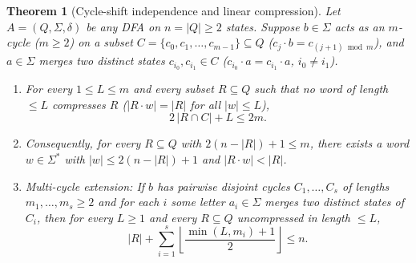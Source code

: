 \documentclass[11pt,a4paper]{article}
\newtheorem{theorem}{Theorem}[section]
\theoremstyle{definition}
\theoremstyle{remark}
\begin{document}
\begin{theorem}[Cycle-shift independence and linear compression]\label{thm:cycle-shift}
Let $A = (Q, \Sigma, \delta)$ be any DFA on $n = |Q| \ge 2$ states. Suppose $b \in \Sigma$ acts as an $m$-cycle ($m \ge 2$) on a subset $C = \{c_0, c_1, \dots, c_{m-1}\} \subseteq Q$ ($c_j \cdot b = c_{(j+1)\bmod m}$), and $a \in \Sigma$ merges two distinct states $c_{i_0}, c_{i_1} \in C$ ($c_{i_0} \cdot a = c_{i_1} \cdot a$, $i_0 \neq i_1$).
\begin{enumerate}[label=\textup{(\arabic*)},leftmargin=*,nosep]
  \item For every $1 \le L \le m$ and every subset $R \subseteq Q$ such that no word of length $\le L$ compresses $R$ ($|R \cdot w| = |R|$ for all $|w| \le L$),
  \[
    2\,|R \cap C| + L \le 2m.
  \]
  \item Consequently, for every $R \subseteq Q$ with $2(n - |R|) + 1 \le m$, there exists a word $w \in \Sigma^*$ with $|w| \le 2(n - |R|) + 1$ and $|R \cdot w| < |R|$.
  \item \emph{Multi-cycle extension:} If $b$ has pairwise disjoint cycles $C_1, \dots, C_s$ of lengths $m_1, \dots, m_s \ge 2$ and for each $i$ some letter $a_i \in \Sigma$ merges two distinct states of $C_i$, then for every $L \ge 1$ and every $R \subseteq Q$ uncompressed in length $\le L$,
  \[
    |R| + \sum_{i = 1}^s \left\lfloor \frac{\min(L, m_i) + 1}{2} \right\rfloor \le n.
  \]
\end{enumerate}
\end{theorem}
\end{document}
